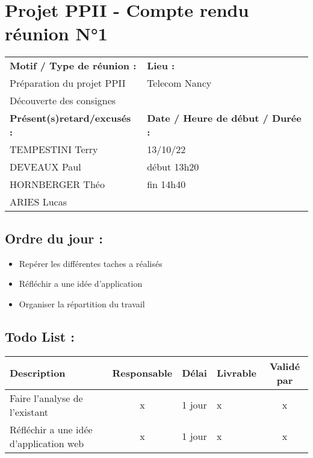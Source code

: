 \documentclass{article}
\begin{document}
\section*{Projet PPII - Compte rendu réunion N°1}
\begin{tabular}{|p{7cm}|p{6cm}|}
    \hline
    \textbf{Motif / Type de réunion :}
    & \textbf{Lieu :}
    \\
    Préparation du projet PPII
    & 
    Telecom Nancy
    \\ 
    Découverte des consignes &
    \\\hline
    \textbf{Présent(s)retard/excusés :}
    &
    \textbf{Date / Heure de début / Durée :}
    \\ 
    TEMPESTINI Terry &  13/10/22\\  
    DEVEAUX Paul & début 13h20\\
    HORNBERGER Théo & fin 14h40\\
    ARIES Lucas & 
    \\ \hline
\end{tabular}

\subsection*{Ordre du jour :}
\begin{itemize}
    \item{Repérer les différentes taches a réalisés}
    \item{Réfléchir a une idée d’application}
    \item{Organiser la répartition du travail}
\end{itemize}

\subsection*{Todo List :}
\begin{tabular}{|p{3.5cm}|c|c|p{4.5cm}|c|}
    \hline 
    Description & Responsable & Délai & Livrable & Validé par 
    \\ \hline
    Faire l’analyse de l’existant & x & 1 jour & x & x
    \\ \hline
    Réfléchir a une idée d’application web & x & 1 jour & x & x
    \\ \hline
\end{tabular}
\end{document}
